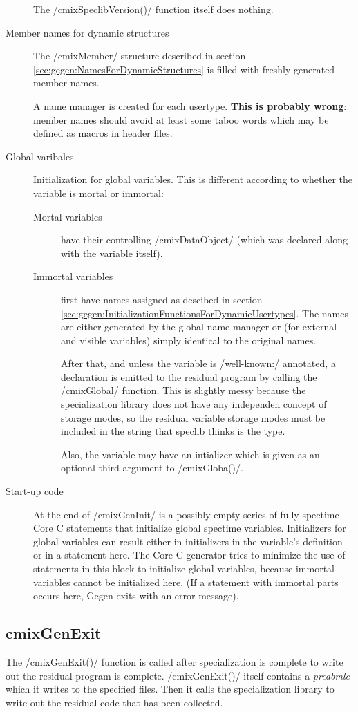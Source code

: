 \begin{docpart}
\begin{description}
	The /cmixSpeclibVersion()/ function itself does nothing.
\item[Member names for dynamic structures] The /cmixMember/ structure
	described in section \ref{sec:gegen:NamesForDynamicStructures}
	is filled with freshly generated member names.

	A name manager is created for each usertype. \textbf{This is
	probably wrong}: member names should avoid at least some
	taboo words which may be defined as macros in header files.

\item[Global varibales] Initialization for global variables. This is
	different according to whether the variable is mortal or
	immortal:
	\begin{description}
	\item[Mortal variables] have their controlling
		/cmixDataObject/ (which was declared along with the
		variable itself).
	\item[Immortal variables] first have names assigned as
		descibed in section
		\ref{sec:gegen:InitializationFunctionsForDynamicUsertypes}.
		The names are either generated by the global name
		manager or (for external and visible variables) simply
		identical to the original names.

		After that, and unless the variable is /well-known:/
		annotated, a declaration is emitted to the residual
		program by calling the /cmixGlobal/ function.
		This is slightly messy because the specialization
		library does not have any independen concept of
		storage modes, so the residual variable storage modes
		must be included in the string that speclib thinks
		is the type.

		Also, the variable may have an intializer which is
		given as an optional third argument to /cmixGloba()/.
	\end{description}
\item[Start-up code] At the end of /cmixGenInit/ is a possibly empty
	series of fully spectime Core C statements that initialize
	global spectime variables. Initializers for global variables
	can result either in initializers in the variable's definition
	or in a statement here. The Core C generator tries to minimize
	the use of statements in this block to initialize global
	variables, because immortal variables cannot be initialized
	here. (If a statement with immortal parts occurs here, Gegen
	exits with an error message).
\end{description}

\subsection{cmixGenExit}
The /cmixGenExit()/ function is called after specialization is
complete to write out the residual program is complete.
/cmixGenExit()/ itself contains a \emph{preabmle} which it writes
to the specified files. Then it calls the specialization library
to write out the residual code that has been collected.


\end{docpart}

